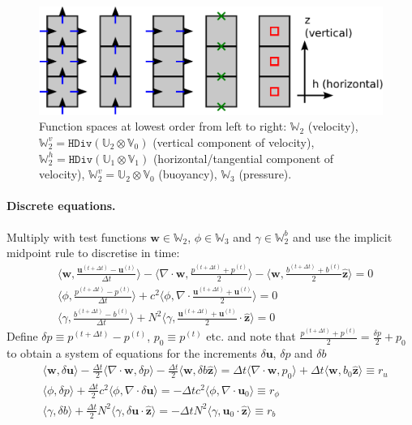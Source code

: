 \documentclass[10pt]{article}
\newcommand{\Uspace}{\mathbb{U}}
\newcommand{\Vspace}{\mathbb{V}}
\newcommand{\Wspace}{\mathbb{W}}
\newcommand{\Hdiv}{\texttt{HDiv}}
\renewcommand{\vec}[1]{\boldsymbol{#1}}
\newcommand{\zhat}{\hat{\vec{z}}}
\newcommand{\ddtdisc}[1]{\frac{{#1}^{(t+\Delta t)}-{#1}^{(t)}}{\Delta t}}
\newcommand{\tavg}[1]{\frac{{#1}^{(t+\Delta t)}+{#1}^{(t)}}{2}}
\begin{document}
\begin{figure}
 \begin{center}
  \includegraphics[width=0.6\linewidth]{functionspaces.pdf}
 \end{center}
 \caption{Function spaces at lowest order from left to right: $\Wspace_2$ (velocity), $\Wspace_2^v = \Hdiv(\Uspace_2\otimes\Vspace_0)$ (vertical component of velocity), $\Wspace_2^h=\Hdiv(\Uspace_1\otimes\Vspace_1)$ (horizontal/tangential component of velocity), $\Wspace_2^v=\Uspace_2\otimes\Vspace_0$ (buoyancy), $\Wspace_3$ (pressure).}
\label{fig:functionspaces}
\end{figure}
\paragraph{Discrete equations.}
Multiply with test functions $\vec{w}\in \Wspace_2$, $\phi\in \Wspace_3$ and $\gamma\in\Wspace_2^b$ and use the implicit midpoint rule to discretise in time:
\begin{equation}
 \begin{aligned}
  &\langle\vec{w},\ddtdisc{\vec{u}}\rangle
  - \langle\nabla\cdot\vec{w},\tavg{p}\rangle
  - \langle\vec{w},\tavg{b}\zhat\rangle = 0\\[1ex]
  &\langle\phi,\ddtdisc{p}\rangle
  +c^2 \langle\phi,\nabla\cdot\tavg{\vec{u}}\rangle
  = 0\\[1ex]
  &\langle\gamma,\ddtdisc{b}\rangle
  + N^2\langle\gamma,\tavg{\vec{u}}\cdot\zhat\rangle
  = 0
 \end{aligned}
\end{equation}
Define $\delta p\equiv p^{(t+\Delta t)}-p^{(t)}$, $p_0\equiv p^{(t)}$ etc. and note that $\tavg{p}=\frac{\delta p}{2}+p_0$ to obtain a system of equations for the increments $\delta\vec{u}$, $\delta p$ and $\delta b$
\begin{equation}
 \begin{aligned}
  &\langle\vec{w},\delta\vec{u}\rangle
  - \frac{\Delta t}{2}\langle\nabla\cdot\vec{w},\delta p\rangle
  - \frac{\Delta t}{2}\langle\vec{w},\delta b\zhat\rangle
  = \Delta t \langle\nabla\cdot\vec{w},p_0\rangle
  + \Delta t \langle\vec{w},b_0\zhat\rangle
  \equiv r_u
 \\[1ex]
  &\langle\phi,\delta p\rangle
  +\frac{\Delta t}{2}c^2\langle\phi,\nabla\cdot\delta\vec{u}\rangle
  = -\Delta tc^2\langle\phi,\nabla\cdot\vec{u}_0\rangle
  \equiv r_\phi
  \\[1ex]
  &\langle\gamma,\delta b\rangle
  + \frac{\Delta t }{2}N^2\langle\gamma,\delta\vec{u}\cdot\zhat\rangle
  = -\Delta t N^2\langle\gamma,\vec{u}_0\cdot\zhat\rangle
  \equiv r_b\label{eqn:Increments}
 \end{aligned}
\end{equation}
\end{document}
